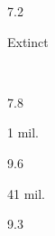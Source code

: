 \begin{description}[font=\normalfont,style=nextline]
\pagebreak
 \item[\langnameWappo] 
 \begin{multicols}{2}\begin{description}[font=\normalfont\itshape,noitemsep] 
 \item[] 
 \item[\pbnumberabbr] 7.2 
 \item[\family] \famYukiWappo 
 \item[]
 \item[]
\item[\nativespeakers] Extinct 
 \item[\region] \regionAlexanderValley\ \Brackets{\regionCalifornia, \regionUSA} 
 \end{description}\end{multicols}
\item[\langnameWelsh] 
 \begin{multicols}{2}\begin{description}[font=\normalfont\itshape,noitemsep] 
 \item[] 
 \item[\pbnumberabbr] 7.8 
 \item[\family] \famIndoEuropean 
 \item[]
\item[\nativespeakers] 1 mil. 
 \item[\region] \regionWales 
 \end{description}\end{multicols}
\item[\langnameYoruba] 
 \begin{multicols}{2}\begin{description}[font=\normalfont\itshape,noitemsep] 
 \item[] 
 \item[\pbnumberabbr] 9.6 
 \item[\family] \famNigerCongo 
 \item[]
\item[\nativespeakers] 41 mil. 
 \item[\region] \regionNigeria 
 \end{description}\end{multicols}
\item[\langnameYupik] 
 \begin{multicols}{2}\begin{description}[font=\normalfont\itshape,noitemsep] 
 \item[] 
 \item[\pbnumberabbr] 9.3 
 \item[\family] \famEskimoAleut 

\end{description}
\end{multicols}
\end{description}
